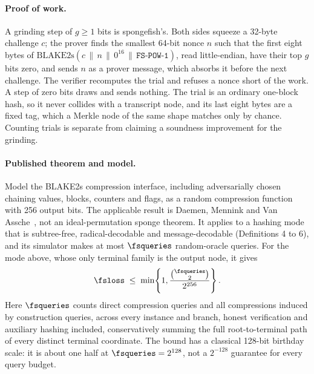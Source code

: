 \paragraph{Proof of work.} A grinding step of $g\ge1$ bits is spongefish's. Both sides squeeze a 32-byte challenge $c$; the prover finds the smallest 64-bit nonce $n$ such that the first eight bytes of $\mathrm{BLAKE2s}(c\,\|\,n\,\|\,0^{16}\,\|\,\texttt{FS-POW-1})$, read little-endian, have their top $g$ bits zero, and sends $n$ as a prover message, which absorbs it before the next challenge. The verifier recomputes the trial and refuses a nonce short of the work. A step of zero bits draws and sends nothing. The trial is an ordinary one-block hash, so it never collides with a transcript node, and its last eight bytes are a fixed tag, which a Merkle node of the same shape matches only by chance. Counting trials is separate from claiming a soundness improvement for the grinding.

\paragraph{Published theorem and model.} Model the BLAKE2s compression interface, including adversarially chosen chaining values, blocks, counters and flags, as a random compression function with 256 output bits. The applicable result is Daemen, Mennink and Van Assche~\cite[Theorem 1, \S4.2]{DMV18}, not an ideal-permutation sponge theorem. It applies to a hashing mode that is subtree-free, radical-decodable and message-decodable (Definitions 4 to 6), and its simulator makes at most $\fsqueries$ random-oracle queries. For the mode above, whose only terminal family is the output node, it gives
\[
  \fsloss \;\le\; \min\!\left\{1,\frac{\binom{\fsqueries}{2}}{2^{256}}\right\}.
\]
Here $\fsqueries$ counts direct compression queries and all compressions induced by construction queries, across every instance and branch, honest verification and auxiliary hashing included, conservatively summing the full root-to-terminal path of every distinct terminal coordinate. The bound has a classical 128-bit birthday scale: it is about one half at $\fsqueries=2^{128}$, not a $2^{-128}$ guarantee for every query budget.

